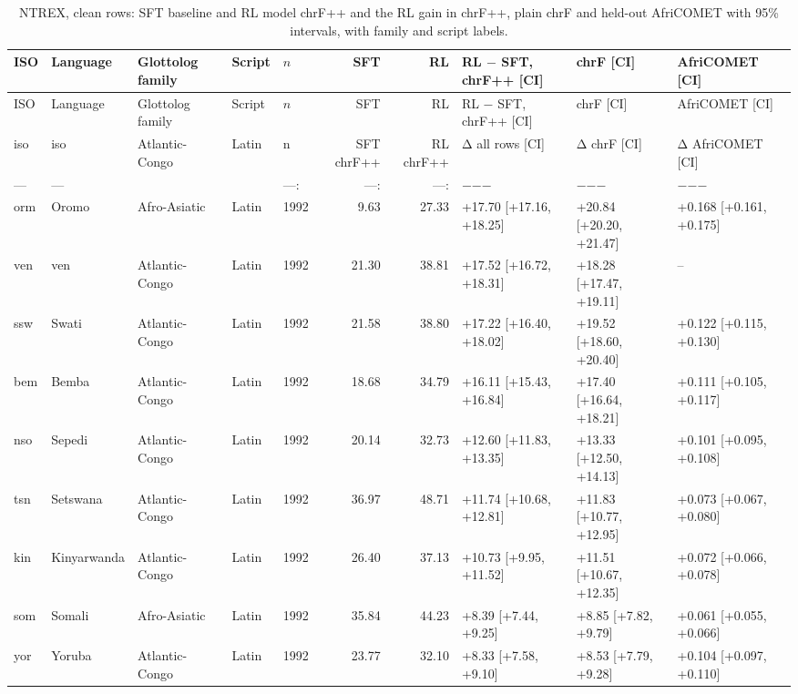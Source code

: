 {\scriptsize\setlength{\tabcolsep}{1.5pt}
\begin{longtable}{@{}lllllrrlll@{}}
\caption{NTREX, clean rows: SFT baseline and RL model chrF++ and the RL gain in chrF++, plain chrF and held-out AfriCOMET with 95\% intervals, with family and script labels.}\label{tab:rl-sft-ntrex-fam}\\
\toprule
ISO & Language & Glottolog family & Script & $n$ & SFT & RL & RL $-$ SFT, chrF++ [CI] & chrF [CI] & AfriCOMET [CI] \\
\midrule\endfirsthead
\toprule
ISO & Language & Glottolog family & Script & $n$ & SFT & RL & RL $-$ SFT, chrF++ [CI] & chrF [CI] & AfriCOMET [CI] \\
\midrule\endhead
\midrule\endfoot
\bottomrule\endlastfoot
iso & iso & Atlantic-Congo & Latin & n & SFT chrF++ & RL chrF++ & Δ all rows [CI] & Δ chrF [CI] & Δ AfriCOMET [CI] \\
--- & --- &  &  & ---: & ---: & ---: & $-$$-$$-$ & $-$$-$$-$ & $-$$-$$-$ \\
orm & Oromo & Afro-Asiatic & Latin & 1992 & 9.63 & 27.33 & +17.70 [+17.16, +18.25] & +20.84 [+20.20, +21.47] & +0.168 [+0.161, +0.175] \\
ven & ven & Atlantic-Congo & Latin & 1992 & 21.30 & 38.81 & +17.52 [+16.72, +18.31] & +18.28 [+17.47, +19.11] & -- \\
ssw & Swati & Atlantic-Congo & Latin & 1992 & 21.58 & 38.80 & +17.22 [+16.40, +18.02] & +19.52 [+18.60, +20.40] & +0.122 [+0.115, +0.130] \\
bem & Bemba & Atlantic-Congo & Latin & 1992 & 18.68 & 34.79 & +16.11 [+15.43, +16.84] & +17.40 [+16.64, +18.21] & +0.111 [+0.105, +0.117] \\
nso & Sepedi & Atlantic-Congo & Latin & 1992 & 20.14 & 32.73 & +12.60 [+11.83, +13.35] & +13.33 [+12.50, +14.13] & +0.101 [+0.095, +0.108] \\
tsn & Setswana & Atlantic-Congo & Latin & 1992 & 36.97 & 48.71 & +11.74 [+10.68, +12.81] & +11.83 [+10.77, +12.95] & +0.073 [+0.067, +0.080] \\
kin & Kinyarwanda & Atlantic-Congo & Latin & 1992 & 26.40 & 37.13 & +10.73 [+9.95, +11.52] & +11.51 [+10.67, +12.35] & +0.072 [+0.066, +0.078] \\
som & Somali & Afro-Asiatic & Latin & 1992 & 35.84 & 44.23 & +8.39 [+7.44, +9.25] & +8.85 [+7.82, +9.79] & +0.061 [+0.055, +0.066] \\
yor & Yoruba & Atlantic-Congo & Latin & 1992 & 23.77 & 32.10 & +8.33 [+7.58, +9.10] & +8.53 [+7.79, +9.28] & +0.104 [+0.097, +0.110] \\

\end{longtable}}
